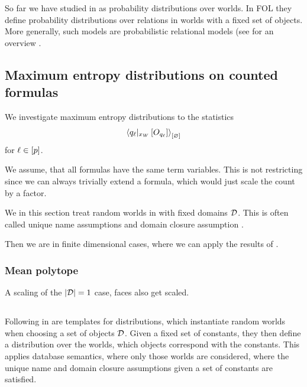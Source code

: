
So far we have studied \MarkovLogicNetworks{} in \propositionalLogic{} as probability distributions over worlds.
In FOL they define probability distributions over relations in worlds with a fixed set of objects.
More generally, such models are probabilistic relational models (see for an overview \cite{getoor_introduction_2019}.


\subsection{Maximum entropy distributions on counted formulas}

We investigate maximum entropy distributions to the statistics
\begin{align*}
    \left\langle {q_{\ell}}|_{x_{W}} \left[O_{q_{\ell}}\right]\right\rangle_{\left[ \varnothing \right]}
\end{align*}
for $\ell\in[p]$.

We assume, that all formulas have the same term variables.
This is not restricting since we can always trivially extend a formula, which would just scale the count by a factor.

We in this section treat random worlds in \firstOrderLogic{} with fixed domains $\mathcal{D}$.
This is often called unique name assumptions and domain closure assumption \cite{russell_artificial_2021}.

Then we are in finite dimensional cases, where we can apply the results of .

\subsubsection{Mean polytope}

A scaling of the $\left|\mathcal{D}\right|=1$ case, faces also get scaled.



%

\subsection{\HybridFOLNetworks{}}

Following \cite{richardson_markov_2006} \MarkovLogicNetworks{} in \firstOrderLogic{} are templates for distributions, which instantiate random worlds when choosing a set of objects $\mathcal{D}$.
Given a fixed set of constants, they then define a distribution over the worlds, which objects correspond with the constants. %
This applies database semantics, where only those worlds are considered, where the unique name and domain closure assumptions given a set of constants are satisfied.

